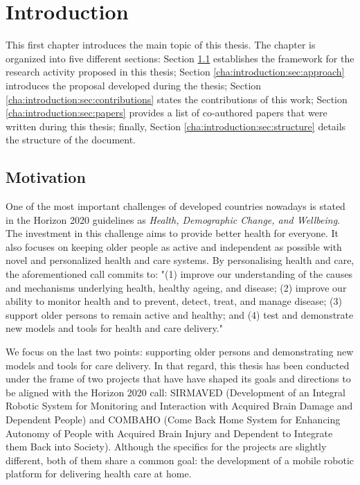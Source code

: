 \chapter{Introduction}
\label{cha:introduction}

\begin{chapterabstract}
This first chapter introduces the main topic of this thesis. The chapter is organized into five different sections: Section \ref{cha:introduction:sec:motivation} establishes the framework for the research activity proposed in this thesis; Section \ref{cha:introduction:sec:approach} introduces the proposal developed during the thesis; Section \ref{cha:introduction:sec:contributions} states the contributions of this work; Section \ref{cha:introduction:sec:papers} provides a list of co-authored papers that were written during this thesis; finally, Section \ref{cha:introduction:sec:structure} details the structure of the document.
\end{chapterabstract}

\minitoc

\clearpage

\section{Motivation}
\label{cha:introduction:sec:motivation}

One of the most important challenges of developed countries nowadays is stated in the Horizon 2020 guidelines as \emph{Health, Demographic Change, and Wellbeing}. The investment in this challenge aims to provide better health for everyone. It also focuses on keeping older people as active and independent as possible with novel and personalized health and care systems. By personalising health and care, the aforementioned call commits to: "(1) improve our understanding of the causes and mechanisms underlying health, healthy ageing, and disease; (2) improve our ability to monitor health and to prevent, detect, treat, and manage disease; (3) support older persons to remain active and healthy; and (4) test and demonstrate new models and tools for health and care delivery."

We focus on the last two points: supporting older persons and demonstrating new models and tools for care delivery. In that regard, this thesis has been conducted under the frame of two projects that have have shaped its goals and directions to be aligned with the Horizon 2020 call: SIRMAVED (Development of an Integral Robotic System for Monitoring and Interaction with Acquired Brain Damage and Dependent People) and COMBAHO (Come Back Home System for Enhancing Autonomy of People with Acquired Brain Injury and Dependent to Integrate them Back into Society). Although the specifics for the projects are slightly different, both of them share a common goal: the development of a mobile robotic platform for delivering health care at home.

